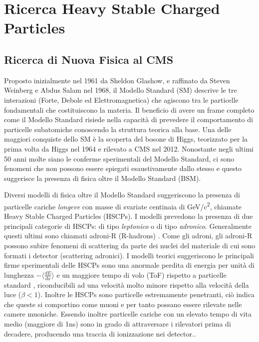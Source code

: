 \chapter{Ricerca Heavy Stable Charged Particles}
\label{cap:TerzoCapitolo}

\section{Ricerca di Nuova Fisica al CMS}
\label{sec:NewPhysics}

Proposto inizialmente nel 1961 da Sheldon Glashow, e raffinato da Steven Weinberg e Abdus Salam nel 1968, il Modello Standard (SM) descrive le tre interazioni (Forte, Debole ed Elettromagnetica) che agiscono tra le particelle fondamentali che costituiscono la materia. Il beneficio di avere un frame completo come il Modello Standard risiede nella capacità di prevedere il comportamento di particelle subatomiche conoscendo la struttura teorica alla base. Una delle maggiori conquiste dello SM è la scoperta del bosone di Higgs, teorizzato per la prima volta da Higgs nel 1964 e rilevato a CMS nel 2012. \newline
Nonostante negli ultimi 50 anni molte siano le conferme sperimentali del Modello Standard, ci sono fenomeni che non possono essere spiegati esaustivamente dallo stesso e questo suggerisce la presenza di fisica oltre il Modello Standard (BSM).

Diversi modelli di fisica oltre il Modello Standard suggeriscono la presenza di particelle cariche \textit{longeve} con masse di svariate centinaia di \si{GeV/c^2}, chiamate Heavy Stable Charged Particles (HSCPs). I modelli prevedono la presenza di due principali categorie di HSCPs: di tipo \textit{leptonico} o di tipo \textit{adronico}. Generalmente questi ultimi sono chiamati adroni-R (R-hadrons) \cite{Quertenmont:2010ota}. \newline
Come gli adroni, gli adroni-R possono subire fenomeni di scattering da parte dei nuclei del materiale di cui sono formati i detector (scattering adronici). I modelli teorici suggeriscono le principali firme sperimentali delle HSCPs sono una anormale perdita di energia per unità di lunghezza $- \langle \frac{dE}{dx}\rangle$ e un maggiore tempo di volo (ToF) rispetto a particelle standard \cite{MasterThesisGioMoc}, riconducibili ad una velocità molto minore rispetto alla velocità della luce ($\beta < 1$). Inoltre le HSCPs sono particelle estremamente penetranti, ciò indica che queste si comportino come muoni e per tanto possano essere rilevate nelle camere muoniche. \newline
Essendo inoltre particelle cariche con un elevato tempo di vita medio (maggiore di 1ns) sono in grado di attraversare i rilevatori prima di decadere, producendo una traccia di ionizzazione nei detector..


